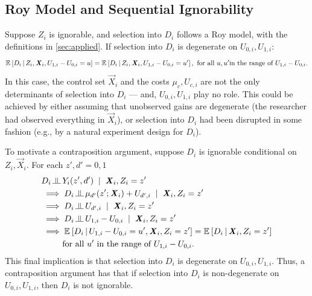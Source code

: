
\subsection{Roy Model and Sequential Ignorability}
\label{appendix:roy-seq-ig}
Suppose $Z_i$ is ignorable, and selection into $D_i$ follows a Roy model, with the definitions in \autoref{sec:applied}.
If selection into $D_i$ is degenerate on $U_{0,i}, U_{1,i}$:
\[ \mathbb{E}_{} \left[ D_i \, \middle\vert \, Z_i, \boldsymbol{\mathit{X}}_i, U_{1,i}- U_{0,i} = u \right]
    = \mathbb{E}_{} \left[ D_i \, \middle\vert \, Z_i, \boldsymbol{\mathit{X}}_i, U_{1,i}- U_{0,i} = u' \right],
    \text{ for all } u, u' \text{in the range of $U_{1,i}- U_{0,i}$.} \]
In this case, the control set $\vec X_i$ and the costs $\mu_c, U_{c,i}$ are not the only determinants of selection into $D_i$ --- and, $U_{0,i}, U_{1,i}$ play no role.
This could be achieved by either assuming that unobserved gains are degenerate (the researcher had observed everything in $\vec X_i$), or selection into $D_i$ had been disrupted in some fashion (e.g., by a natural experiment design for $D_i$).

To motivate a contraposition argument, suppose $D_i$ is ignorable conditional on $Z_i, \vec X_i$.
For each $z', d' = 0, 1$
\begin{align*}
    & D_i \indep Y_i(z', d') \;\; | \;\; \vec X_i, Z_i = z' \\
    &\implies D_i \indep \mu_{d'}(z'; \vec X_i) + U_{d',i} \;\; | \;\; \vec X_i, Z_i = z' \\
    &\implies D_i \indep U_{d',i} \;\; | \;\; \vec X_i, Z_i = z' \\
    &\implies D_i \indep U_{1,i} - U_{0,i} \;\; | \;\; \vec X_i, Z_i = z' \\
    &\implies \Egiven{D_i}{U_{1,i} - U_{0,i} = u', \vec X_i, Z_i = z'}
    = \Egiven{D_i}{\vec X_i, Z_i = z'} \\
    & \;\;\; \;\;\; \;\;\; \text{for all } u' \text{ in the range of $U_{1,i}- U_{0,i}$.}
\end{align*}
This final implication is that selection into $D_i$ is degenerate on $U_{0,i}, U_{1,i}$.
Thus, a contraposition argument has that if selection into $D_i$ is non-degenerate on $U_{0,i}, U_{1,i}$, then $D_i$ is not ignorable.


